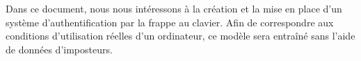 Dans ce document, nous nous intéressons à la création et la mise en place d'un système d'authentification par la frappe au clavier. Afin de correspondre aux conditions d'utilisation réelles d'un ordinateur, ce modèle sera entraîné sans l'aide de données d'imposteurs.